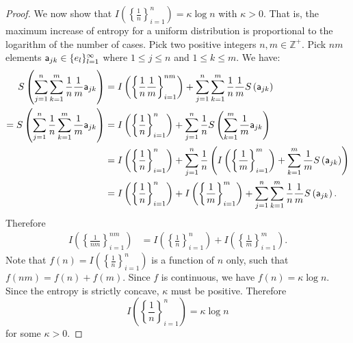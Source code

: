 \begin{mathSection}
\begin{proof}
	We now show that $I\left(\left\{\frac{1}{n}\right\}_{i=1}^{n}\right) = \kappa \log n$ with $\kappa > 0$. That is, the maximum increase of entropy for a uniform distribution is proportional to the logarithm of the number of cases. Pick two positive integers $n, m \in \mathbb{Z}^+$. Pick $nm$ elements $\ens[a]_{jk} \in \{e_l\}_{l=1}^{\infty}$ where $1\leq j \leq n$ and $1 \leq  k \leq m$. We have:
	\begin{equation}
		\begin{aligned}
			S\left(\sum_{j=1}^{n}\sum_{k=1}^{m} \frac{1}{n}\frac{1}{m} \ens[a]_{jk}\right) &= I\left(\left\{ \frac{1}{n}\frac{1}{m}\right\}_{i=1}^{nm}\right) + \sum_{j=1}^{n}\sum_{k=1}^{m} \frac{1}{n}\frac{1}{m} S\left(\ens[a]_{jk}\right) \\
			= S\left(\sum_{j=1}^{n} \frac{1}{n} \sum_{k=1}^{m} \frac{1}{m} \ens[a]_{jk}\right)  &=I\left(\left\{ \frac{1}{n}\right\}_{i=1}^{n}\right) + \sum_{j=1}^{n} \frac{1}{n} S\left(\sum_{k=1}^{m}\frac{1}{m}\ens[a]_{jk}\right) \\
			&=I\left(\left\{ \frac{1}{n}\right\}_{i=1}^{n}\right) + \sum_{j=1}^{n} \frac{1}{n}\left(I\left(\left\{ \frac{1}{m}\right\}_{i=1}^{m}\right) +  \sum_{k=1}^{m}\frac{1}{m}S\left(\ens[a]_{jk}\right)\right) \\
			&=I\left(\left\{ \frac{1}{n}\right\}_{i=1}^{n}\right) + I\left(\left\{ \frac{1}{m}\right\}_{i=1}^{m}\right) + \sum_{j=1}^{n} \sum_{k=1}^{m}\frac{1}{n}\frac{1}{m}S\left(\ens[a]_{jk}\right).
		\end{aligned}
	\end{equation}
	Therefore
	\begin{equation}
		\begin{aligned}
			I\left(\left\{ \frac{1}{nm}\right\}_{i=1}^{nm}\right) &=I\left(\left\{ \frac{1}{n}\right\}_{i=1}^{n}\right) + I\left(\left\{ \frac{1}{m}\right\}_{i=1}^{m}\right).
		\end{aligned}
	\end{equation}
	Note that $f(n) = I\left(\left\{ \frac{1}{n}\right\}_{i=1}^{n}\right)$ is a function of $n$ only, such that $f(nm) = f(n) + f(m)$. Since $f$ is continuous, we have $f(n) = \kappa \log n$. Since the entropy is strictly concave, $\kappa$ must be positive. Therefore
	\begin{equation}
		I\left(\left\{ \frac{1}{n}\right\}_{i=1}^{n}\right) = \kappa \log n
	\end{equation}
	for some $\kappa>0$.
	

\end{proof}
\end{mathSection}
